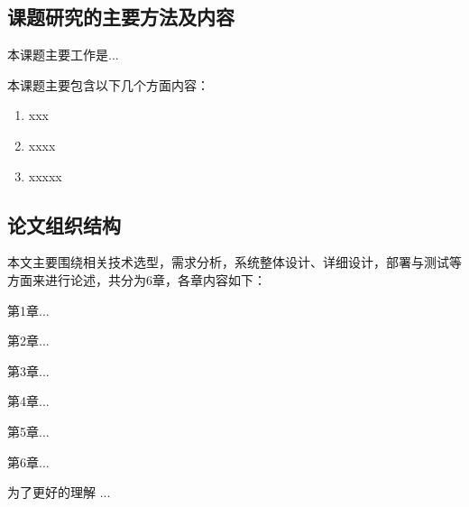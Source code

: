   	\subsection{课题研究的主要方法及内容}

 	本课题主要工作是...

  	本课题主要包含以下几个方面内容：
  
  	\begin{enumerate}
		\item xxx 
		\item xxxx
		\item xxxxx
  	\end{enumerate}

  	\subsection{论文组织结构}
  
  	本文主要围绕相关技术选型，需求分析，系统整体设计、详细设计，部署与测试等方面来进行论述，共分为6章，各章内容如下：
	
	第1章...
	
    第2章...
    
    第3章...
    
    第4章... 
       
    第5章...
    
    第6章...
    
    为了更好的理解 ...
    
\clearpage